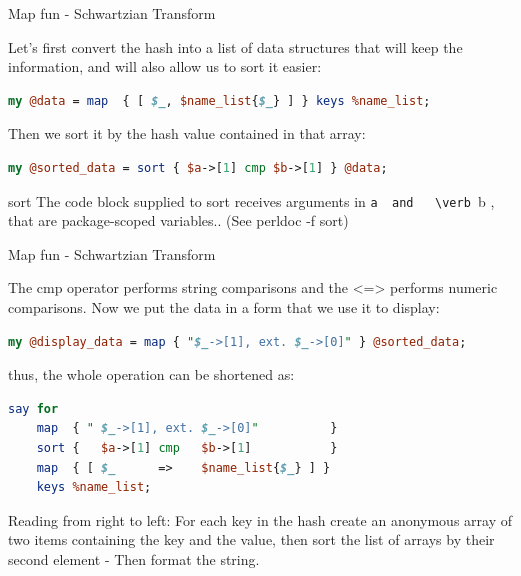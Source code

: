 \documentclass[10pt]{beamer}
\begin{document}
 \begin{frame}[fragile]{Map fun - Schwartzian Transform}
 
 Let's  first convert the hash into a list of data structures that will keep  the information, and will also allow us to sort it easier:
\begin{lstlisting}[language=perl]
 my @data = map  { [ $_, $name_list{$_} ] } keys %name_list;
\end{lstlisting}
Then we sort it by the hash value contained in that array:
\begin{lstlisting}[language=perl]
    my @sorted_data = sort { $a->[1] cmp $b->[1] } @data;
\end{lstlisting}
\begin{alertblock}{sort}
The code block supplied to sort receives arguments in \verb $a  and   \verb $b , that are package-scoped variables.. (See perldoc -f sort) 
\end{alertblock}
 \end{frame}


 \begin{frame}[fragile]{Map fun - Schwartzian Transform}

The cmp operator performs string comparisons and the <=> performs numeric comparisons. Now we put the data in a form that we use it to display:
\begin{lstlisting}[language=perl]
my @display_data = map { "$_->[1], ext. $_->[0]" } @sorted_data;
\end{lstlisting}
thus, the whole operation can be shortened as:
\begin{lstlisting}[language=perl]
say for
    map  { " $_->[1], ext. $_->[0]"          }
    sort {   $a->[1] cmp   $b->[1]           }
    map  { [ $_      =>    $name_list{$_} ] }
    keys %name_list;
\end{lstlisting}

Reading from right to left: For each key in the hash create an anonymous array of two items containing the key and the value, then sort the list of arrays by their second element - Then format the string.
\pause
{}

\end{frame}
\end{document}

